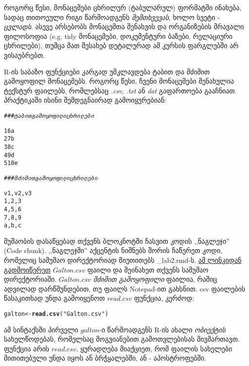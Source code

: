 \documentclass{article}\usepackage[]{graphicx}\usepackage[]{color}
\makeatletter
\newcommand{\hlstr}[1]{\textcolor[rgb]{0.192,0.494,0.8}{#1}}%
\newcommand{\hlcom}[1]{\textcolor[rgb]{0.678,0.584,0.686}{\textit{#1}}}%
\newcommand{\hlstd}[1]{\textcolor[rgb]{0.345,0.345,0.345}{#1}}%
\newcommand{\hlkwb}[1]{\textcolor[rgb]{0.69,0.353,0.396}{#1}}%
\newcommand{\hlkwd}[1]{\textcolor[rgb]{0.737,0.353,0.396}{\textbf{#1}}}%
\newenvironment{kframe}{%
 \def\at@end@of@kframe{}%
 \ifinner\ifhmode%
  \def\at@end@of@kframe{\end{minipage}}%
  \begin{minipage}{\columnwidth}%
 \fi\fi%
 \def\FrameCommand##1{\hskip\@totalleftmargin \hskip-\fboxsep
 \colorbox{shadecolor}{##1}\hskip-\fboxsep
     \hskip-\linewidth \hskip-\@totalleftmargin \hskip\columnwidth}%
 \MakeFramed {\advance\hsize-\width
   \@totalleftmargin\z@ \linewidth\hsize
   \@setminipage}}%
 {\par\unskip\endMakeFramed%
 \at@end@of@kframe}
\newenvironment{knitrout}{}{} %
\makeatother
\begin{document}
როგორც წესი, მონაცემები ცხრილურ (ტაბულარულ) ფორმატში ინახება, სადაც თითოეული რიგი წარმოადგენს \emph{შემთხვევას}, ხოლო სვეტი -  \emph{ცვლადს}. ასევე არსებობს მონაცემთა შენახვის და ორგანიზების მრავალი ფილოსოფია (e.g. tidy მონაცემები, დოკუმენტური ბაზები, რელაციური ცხრილები), თუმცა მათ შესახებ დეტალურად ამ კურსის ფარგლებში არ ვისაუბრებთ.

R-ის საბაზო ფუნქციები კარგად უმკლავდება ტაბით და მძიმით გამოყოფილ მონაცემებს. როგორც წესი, ჩვენი მონაცემები შენახულია ტექსტურ ფაილებს, რომლებსაც \emph{.csv}, \emph{.txt} ან \emph{dat} გაფართოება გააჩნიათ. პრაქტიკაში ისინი შემდეგნაირად გამოიყურებიან:

\begin{knitrout}
\color{fgcolor}\begin{kframe}
\begin{alltt}
\hlcom{### ტაბით გამოყოფილი ცხრილები}

1   6   a
2   7   b
3   8   c
4   9   d
5   10  e

\hlcom{### მძიმით გამოყოფილი ცხრილები}

v1,v2,v3
1,2,3
4,5,6
7,8,9
a,b,c
\end{alltt}
\end{kframe}
\end{knitrout}

მუშაობის დასაწყებად თქვენს ბლოკნოტში ჩასვით კოდის ,,ნაგლეჯი'' (Code chunk). ,,ნაგლეჯში'' აქცენტის ნიშნებს შორის ჩაწერეთ კოდი, რომელიც სამუშაო დირექტორიად მიუთითებს \_lab2.rmd-ს.  \href{https://www.dropbox.com/s/yfmdhohpp31utwt/Galton.csv?dl=0}{ამ ლინკიდან გადმოიწერეთ} $Galton.csv$ ფაილი და შეინახეთ თქვენს სამუშაო დირექტორიაში. $Galton.csv$ \emph{მძიმით გამოყოფილი} ფაილია, რაშიც ადვილად დარწმუნდებით, თუ ფაილს Notepad-ით გახსნით. csv ფაილების წასაკითხად უნდა გამოიყენოთ $read.csv$ ფუნქცია, კერძოდ:

\begin{knitrout}
\color{fgcolor}\begin{kframe}
\begin{alltt}
\hlstd{galton} \hlkwb{<-} \hlkwd{read.csv}\hlstd{(}\hlstr{"Galton.csv"}\hlstd{)}
\end{alltt}
\end{kframe}
\end{knitrout}


ამ სინტაქსში პირველი $galton$-ი წარმოადგენს R-ის ახალი \emph{ობიექტის} სახელწოდებას, რომელსაც მოგვიანებით გამოთვლებისას მივმართავთ. ფუნქცია არის $read.csv$. ყურადღება მიაქციეთ, რომ ფაილის სახელები მითითებული უნდა იყოს ან ბრჭყალებში, ან - აპოსტროფებში.
\end{document}
